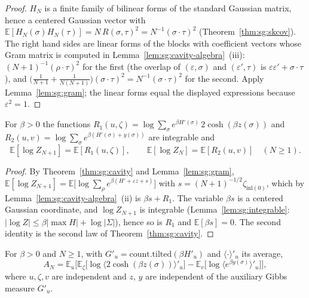 \begin{proof}
  \leanok
$H_N$ is a finite family of bilinear forms of the standard Gaussian matrix, hence a centered Gaussian vector with
$\mathbb E[H_N(\sigma)H_N(\tau)]=N\,R(\sigma,\tau)^2=N^{-1}(\sigma\cdot\tau)^2$ (Theorem~\ref{thm:sg:skcov}). The right hand sides are linear forms of the blocks
with coefficient vectors whose Gram matrix is computed in Lemma~\ref{lem:sg:cavity-algebra}~(iii): $(N+1)^{-1}(\rho\cdot\tau)^2$ for the first (the
overlap of $(\varepsilon,\sigma)$ and $(\varepsilon',\tau)$ is $\varepsilon\varepsilon'+\sigma\cdot\tau$), and
$\big(\tfrac1{N+1}+\tfrac1{N(N+1)}\big)(\sigma\cdot\tau)^2=N^{-1}(\sigma\cdot\tau)^2$ for the second. Apply Lemma~\ref{lem:sg:gram}; the linear forms
equal the displayed expressions because $\varepsilon^2=1$.
\end{proof}

\begin{theorem}\label{thm:sg:partition}
  \leanok
For $\beta>0$ the functions $R_1(u,\zeta)=\log\sum_\sigma e^{\beta H'(\sigma)}\,2\cosh(\beta z(\sigma))$ and
$R_2(u,v)=\log\sum_\sigma e^{\beta(H'(\sigma)+y(\sigma))}$ are integrable and
\[\mathbb E[\log Z_{N+1}]=\mathbb E[R_1(u,\zeta)],\qquad\mathbb E[\log Z_N]=\mathbb E[R_2(u,v)]\quad(N\ge1).\]
\end{theorem}

\begin{proof}
  \leanok
By Theorem~\ref{thm:sg:cavity} and Lemma~\ref{lem:sg:gram}, $\mathbb E[\log Z_{N+1}]=\mathbb E\big[\log\sum_\rho e^{\beta(H'+\varepsilon z+s)}\big]$ with
$s=(N+1)^{-1/2}\zeta_{\mathrm{inl}(0)}$, which by Lemma~\ref{lem:sg:cavity-algebra}~(ii) is $\beta s+R_1$. The variable $\beta s$ is a centered
Gaussian coordinate, and $\log Z_{N+1}$ is integrable (Lemma~\ref{lem:sg:integrable}: $|\log Z|\le\beta|\max H|+\log|\Sigma|$), hence so is $R_1$ and
$\mathbb E[\beta s]=0$. The second identity is the second law of Theorem~\ref{thm:sg:cavity}.
\end{proof}

\begin{theorem}\label{thm:sg:ass}
  \leanok
For $\beta>0$ and $N\ge1$, with $G'_u=\mathrm{count.tilted}(\beta H'_u)$ and $\langle\cdot\rangle'_u$ its average,
\[A_N=\mathbb E_u\Big[\mathbb E_\zeta\big[\log\big\langle 2\cosh(\beta z(\sigma))\big\rangle'_u\big]-\mathbb E_v\big[\log\big\langle e^{\beta y(\sigma)}\big\rangle'_u\big]\Big],\]
where $u,\zeta,v$ are independent and $z$, $y$ are independent of the auxiliary Gibbs measure $G'_u$.
\end{theorem}

